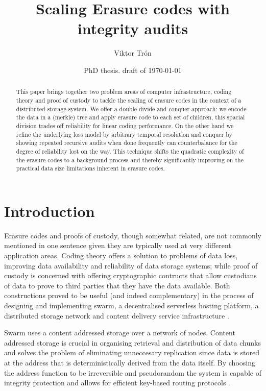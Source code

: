 \documentclass[12pt]{article}
\title{Scaling Erasure codes with integrity audits}
\author{Viktor Trón}
\date{PhD thesis. draft of \today} %
\begin{document}
\maketitle
\tableofcontents

\begin{abstract}
This paper brings together two problem areas of computer infrastructure, coding theory and proof of custody to tackle the scaling of erasure codes in the context of a distributed storage system. We offer a double divide and conquer approach: we encode the data in a (merkle) tree and apply erasure code to each set of children, this spacial division trades off reliability for linear coding performance. On the other hand we refine the underlying loss model by arbitrary temporal resolution and conquer by showing repeated recursive audits when done frequently can counterbalance for the degree of reliability lost on the way. This technique shifts the quadratic complexity of the erasure codes to a background process and thereby significantly improving on the practical data size limitations inherent in erasure codes.
\end{abstract}

\section{Introduction}

Erasure codes and proofs of custody, though somewhat related, are not commonly mentioned in one sentence given they are typically used at very different application areas. Coding theory offers a solution to problems of data loss, improving data availability and reliability of data storage systems; while proof of custody is concerned with offering cryptographic contructs that allow custodians of data to prove to third parties that they have the data available.
Both constructions proved to be useful (and indeed complementary) in the process of designing and implementing swarm, a decentralised serverless hosting platform, a distributed storage network and content delivery service infrastructure \cite{ethersphere2016sw3}.

Swarm uses a content addressed storage over a network of nodes. Content addressed storage is crucial in organising retrieval and distribution of data chunks and solves the problem of eliminating unneccesary replication since data is stored at the address that is deterministically derived from the data itself. By choosing the address function to be irreversible and pseudorandom the system is capable of integrity protection and allows for efficient key-based routing protocols \cite{maymounkov2002kademlia}.
\end{document}
